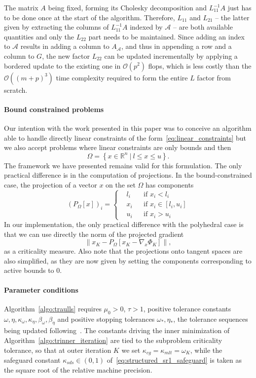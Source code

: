 \documentclass{article}
\numberwithin{equation}{section}
\newcommand{\RR}{{\mathbb{R}}} %
\newcommand{\calA}{{\mathcal{A}}}
\newcommand{\calO}{{\mathcal{O}}}
\newcommand{\proj}[2]{P_{#1} \left[ {#2} \right]} %
\theoremstyle{plain}
\begin{document}
	The matrix $A$ being fixed, forming its Cholesky decomposition and $L_{11}^{-1} A$ just has to be done once at the start of the algorithm. Therefore, $L_{11}$ and $L_{21}$ -- the latter given by extracting the columns of $L_{11}^{-1} A$ indexed by $\calA$ -- are both available quantities and only the $L_{22}$ part needs to be maintained. Since adding an index to $\calA$ results in adding a column to $A_\calA$, and thus in appending a row and a column to $G$, the new factor $L_{22}$ can be updated incrementally by applying a bordered update to the existing one in $\calO(p^2)$ flops, which is less costly than the $\calO((m+p)^3)$ time complexity required to form the entire $L$ factor from scratch.
	\paragraph*{Bound constrained problems}
	Our intention with the work presented in this paper was to conceive an algorithm able to handle directly linear constraints of the form~\eqref{eq:linear_constraints} but we also accept problems where linear constraints are only bounds and then
	\[\Omega = \left\{x \in \RR^n \ |\ l \le x \le u\right\}.\]
	The framework we have presented remains valid for this formulation. The only practical difference is in the computation of projections. In the bound-constrained  case, the projection of a vector $x$ on the set $\Omega$ has components
	\begin{equation}\label{eq:projection_bounds}
		\left(\proj{\Omega}{x}\right)_i = 
		\left\{ \begin{aligned}
			& l_i & &\text{if } x_i < l_i \\
			& x_i & &\text{if } x_i \in [l_i,u_i] \\
			& u_i & &\text{if } x_i > u_i
		\end{aligned} \right.
	\end{equation}
	In our implementation, the only practical difference with the polyhedral case is that we can use directly the norm of the projected gradient
	\[\left\| x_K - \proj{\Omega}{x_K-\nabla_x\Phi_K}\right\|,\]
	as a criticality measure. Also note that the projections onto tangent spaces are also simplified, as they are now given by setting the components corresponding to active bounds to $0$.
	
	\paragraph*{Parameter conditions} 
	Algorithm~\ref{algo:traulls} requires $\mu_0 > 0$, $\tau > 1$, positive tolerance constants $\omega,\eta,\kappa_\omega,\kappa_\eta,\beta_\omega,\beta_\eta$ and positive stopping tolerances $\omega_*,\eta_*$, the tolerance sequences being updated following~\cite[Chapter~14]{conn-etal:2000}. The constants driving the inner minimization of Algorithm~\ref{algo:trinner_iteration} are tied to the subproblem criticality tolerance, so that at outer iteration $K$ we set $\kappa_{cg} = \kappa_{mlt} = \omega_K$, while the safeguard constant $\kappa_{sds} \in (0,1)$ of~\eqref{eq:structured_sr1_safeguard} is taken as the square root of the relative machine precision.
	
\end{document}
